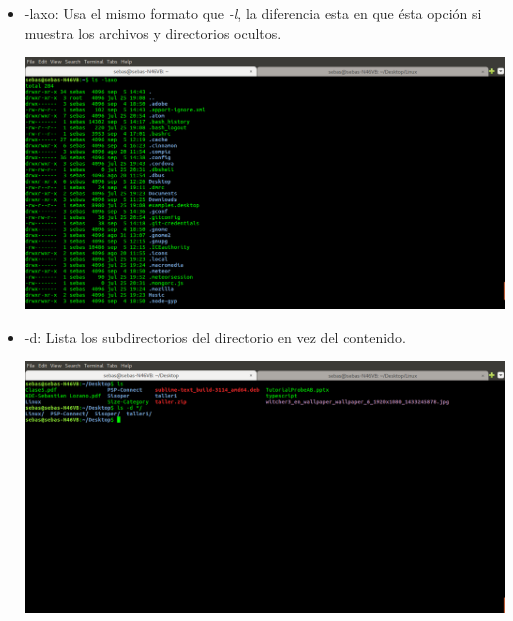 \documentclass{article}
\begin{document}
\begin{itemize}
\begin{minipage}{\linewidth}
        \end{minipage}
    \item -laxo: Usa el mismo formato que \emph{-l}, la diferencia esta en que ésta opción si muestra los archivos y directorios ocultos.\par
    	\begin{minipage}{\linewidth}
            \centering
            \includegraphics[width=\textwidth]{ls-laxo.png}
        \end{minipage}
    \item -d: Lista los subdirectorios del directorio en vez del contenido.\par
    	\begin{minipage}{\linewidth}
            \centering
            \includegraphics[width=\textwidth]{ls-d.png}
        \end{minipage}
\end{itemize}
\end{document}
